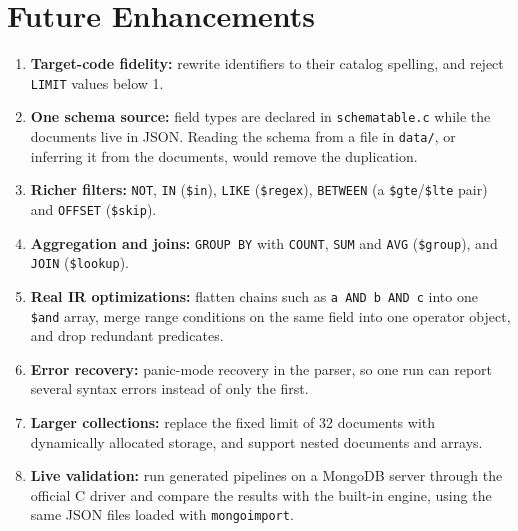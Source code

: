 \documentclass[12pt,a4paper]{report}
\newcommand{\codeus}{\textunderscore\allowbreak}
\DeclareRobustCommand{\code}[1]{\texttt{\let\_\codeus #1}}
\begin{document}
\chapter{Future Enhancements}\label{ch:future}
\begin{enumerate}
  \item \textbf{Target-code fidelity:} rewrite identifiers to their catalog spelling, and reject \code{LIMIT} values below 1.
  \item \textbf{One schema source:} field types are declared in \code{schema\_table.c} while the documents live in JSON. Reading the schema from a file in \code{data/}, or inferring it from the documents, would remove the duplication.
  \item \textbf{Richer filters:} \code{NOT}, \code{IN} (\code{\$in}), \code{LIKE} (\code{\$regex}), \code{BETWEEN} (a \code{\$gte}/\code{\$lte} pair) and \code{OFFSET} (\code{\$skip}).
  \item \textbf{Aggregation and joins:} \code{GROUP BY} with \code{COUNT}, \code{SUM} and \code{AVG} (\code{\$group}), and \code{JOIN} (\code{\$lookup}).
  \item \textbf{Real IR optimizations:} flatten chains such as \code{a AND b AND c} into one \code{\$and} array, merge range conditions on the same field into one operator object, and drop redundant predicates.
  \item \textbf{Error recovery:} panic-mode recovery in the parser, so one run can report several syntax errors instead of only the first.
  \item \textbf{Larger collections:} replace the fixed limit of 32 documents with dynamically allocated storage, and support nested documents and arrays.
  \item \textbf{Live validation:} run generated pipelines on a MongoDB server through the official C driver and compare the results with the built-in engine, using the same JSON files loaded with \code{mongoimport}.
\end{enumerate}
\end{document}
